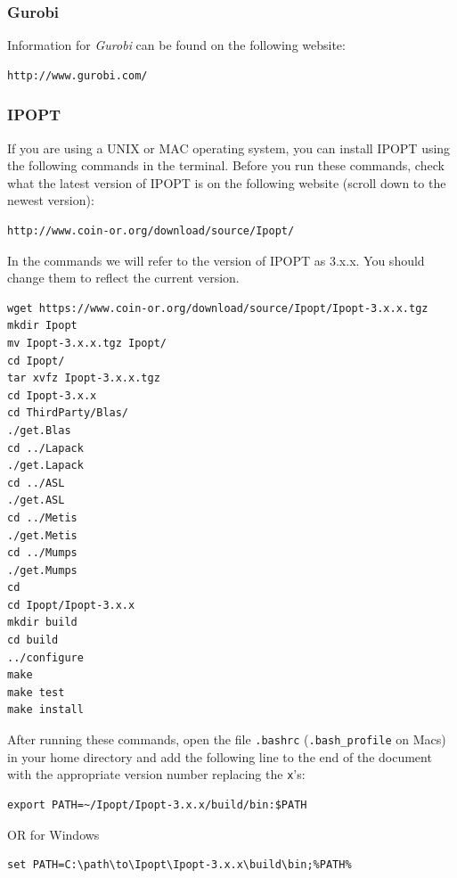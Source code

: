 \documentclass[11pt]{article}
\begin{document}
\subsubsection{Gurobi}
Information for \textit{Gurobi} can be found on the following website:
\begin{verbatim}
http://www.gurobi.com/
\end{verbatim}

\subsubsection{IPOPT}
If you are using a UNIX or MAC operating system, you can install IPOPT using the following commands in the terminal. Before you run these commands, check what the latest version of IPOPT is on the following website (scroll down to the newest version):
\begin{verbatim}
http://www.coin-or.org/download/source/Ipopt/
\end{verbatim}
In the commands we will refer to the version of IPOPT as 3.x.x. You should change them to reflect the current version.
\begin{framed}
\begin{verbatim}
wget https://www.coin-or.org/download/source/Ipopt/Ipopt-3.x.x.tgz
mkdir Ipopt 
mv Ipopt-3.x.x.tgz Ipopt/
cd Ipopt/
tar xvfz Ipopt-3.x.x.tgz
cd Ipopt-3.x.x
cd ThirdParty/Blas/
./get.Blas
cd ../Lapack
./get.Lapack
cd ../ASL
./get.ASL
cd ../Metis
./get.Metis
cd ../Mumps
./get.Mumps
cd
cd Ipopt/Ipopt-3.x.x
mkdir build
cd build
../configure
make
make test
make install
\end{verbatim}
\end{framed}
After running these commands, open the file \texttt{.bashrc} (\texttt{.bash\_profile} on Macs) in your home directory and add the following line to the end of the document with the appropriate version number replacing the \texttt{x}'s:
\begin{verbatim}
export PATH=~/Ipopt/Ipopt-3.x.x/build/bin:$PATH
\end{verbatim}

OR for Windows

\begin{verbatim}
set PATH=C:\path\to\Ipopt\Ipopt-3.x.x\build\bin;%PATH%
\end{verbatim}
\end{document}
